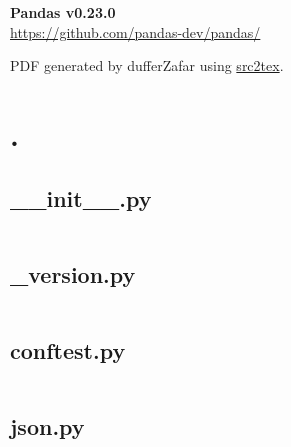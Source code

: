\documentclass{article}
\begin{document}

\title{}
\author{Shadab Zafar}

\begin{titlepage}
   \begin{center}
    \Huge
    \textbf{Pandas v0.23.0} \\


    \LARGE
    \href{https://github.com/pandas-dev/pandas/}{https://github.com/pandas-dev/pandas/}


    \large
    PDF generated by dufferZafar using \href{http://github.com/dufferzafar/src2tex}{src2tex}.
   \end{center}
\end{titlepage}

\newpage

\tableofcontents
\newpage



\section{.}

\subsection{\_\_init\_\_.py}
\inputminted{python}{/home/dufferzafar/dev/@clones/pandas/pandas/__init__.py}
\newpage

\subsection{\_version.py}
\inputminted{python}{/home/dufferzafar/dev/@clones/pandas/pandas/_version.py}
\newpage

\subsection{conftest.py}
\inputminted{python}{/home/dufferzafar/dev/@clones/pandas/pandas/conftest.py}
\newpage

\subsection{json.py}
\inputminted{python}{/home/dufferzafar/dev/@clones/pandas/pandas/json.py}
\newpage
\end{document}
